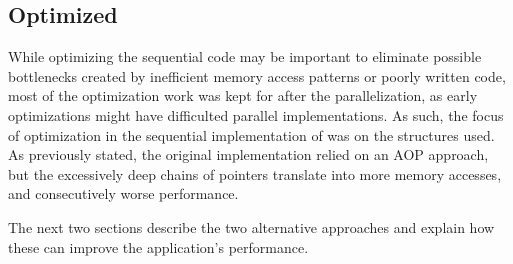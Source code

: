 \subsection{Optimized}


While optimizing the sequential code may be important to eliminate possible bottlenecks created by inefficient memory access patterns or poorly written code, most of the optimization work was kept for after the parallelization, as early optimizations might have difficulted parallel implementations. As such, the focus of optimization in the sequential implementation of \polu was on the structures used. As previously stated, the original implementation relied on an AOP approach, but the excessively deep chains of pointers translate into more memory accesses, and consecutively worse performance.

The next two sections describe the two alternative approaches and explain how these can improve the application's performance.



